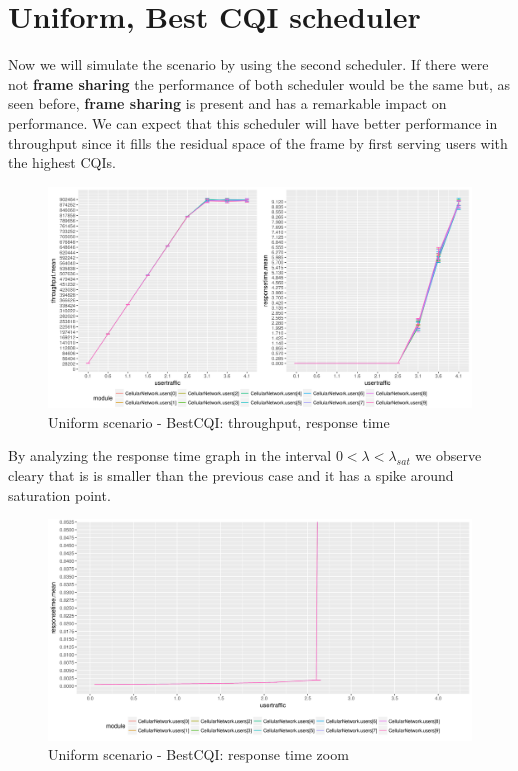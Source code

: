 \section{Uniform, Best CQI scheduler}
Now we will simulate the scenario by using the second scheduler. If there were not \textbf{frame sharing} the performance of both scheduler would be the same but, as seen before, \textbf{frame sharing} is present and has a remarkable impact on performance. We can expect that this scheduler will have better performance in throughput since it fills the residual space of the frame by first serving users with the highest CQIs.
\begin{figure}[H]
  \includegraphics[width=1\textwidth]{images/all-unifbest}
   \caption{Uniform scenario - BestCQI: throughput, response time}
  \label{fig:Uniform scenario - BestCQI: throughput, response time}
\end{figure}

By analyzing the response time graph in the interval \(0 < \lambda < \lambda_{sat}\) we observe cleary that is is smaller than the previous case and it has a spike around saturation point.
\begin{figure}[H]
  \includegraphics[width=1\textwidth]{images/allrt-unifbest}
   \caption{Uniform scenario - BestCQI: response time zoom}
  \label{fig:Uniform scenario - BestCQI: response time zoom}
\end{figure}

